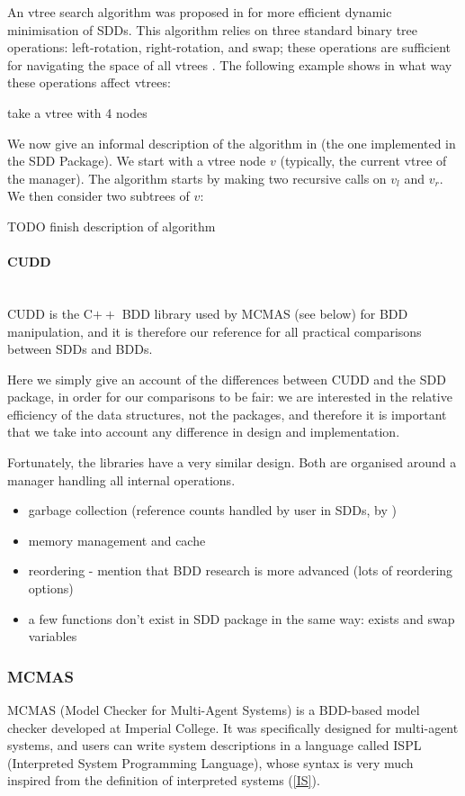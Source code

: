 \documentclass[12]{article}
\newenvironment{example}[1][Example]{\begin{trivlist}
\item[\hskip \labelsep {\bfseries #1}]}{\end{trivlist}}
\newcommand{\myparagraph}[1]{\paragraph{#1}\mbox{}\\}
\begin{document}
An vtree search algorithm was proposed in \cite{sdd_3} for more efficient dynamic minimisation of SDDs. This algorithm relies on three standard binary tree operations: left-rotation, right-rotation, and swap; these operations are sufficient for navigating the space of all vtrees \cite{knuth}.
The following example shows in what way these operations affect vtrees: 
\begin{example}
take a vtree with 4 nodes
\end{example}

We now give an informal description of the algorithm in \cite{sdd_3} (the one implemented in the SDD Package). We start with a vtree node $v$ (typically, the current vtree of the manager). The algorithm starts by making two recursive calls on $v_l$ and $v_r$. We then consider two subtrees of $v$: 

\noindent TODO finish description of algorithm

\myparagraph{CUDD}

CUDD is the C$++$ BDD library used by MCMAS (see below) for BDD manipulation, and it is therefore our reference for all practical comparisons between SDDs and BDDs. 

Here we simply give an account of the differences between  CUDD and the SDD package, in order for our comparisons to be fair: we are interested in the relative efficiency of the data structures, not the packages, and therefore it is important that we take into account any difference in design and implementation. 

Fortunately, the libraries have a very similar design. Both are organised around a manager handling all internal operations. 
\begin{itemize}
\item garbage collection (reference counts handled by user in SDDs, by )
\item memory management and cache
\item reordering - mention that BDD research is more advanced (lots of reordering options)
\item a few functions don't exist in SDD package in the same way: exists and swap variables
\end{itemize}
\label{gc}

\subsubsection{MCMAS} 

MCMAS (Model Checker for Multi-Agent Systems) is a BDD-based model checker developed at Imperial College. It was specifically designed for multi-agent systems, and users can write system descriptions in a language called ISPL (Interpreted System Programming Language), whose syntax is very much inspired from the definition of interpreted systems (\ref{IS}).
\end{document}
